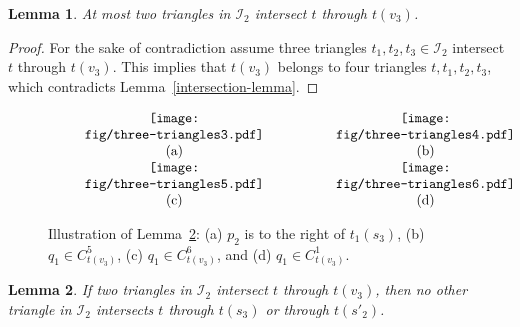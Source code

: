 \documentclass[11pt,a4paper]{article}
\newcommand{\trmin}{t}
\newcommand{\tra}[2]{{#1}({#2})}
\newtheorem{lemma}{Lemma}
\begin{document}
\begin{lemma}
\label{vertex-intersection}
 At most two triangles in $\mathcal{I}_2$ intersect $\trmin$ through $\tra{\trmin}{v_3}$.
\end{lemma}
\begin{proof}
For the sake of contradiction assume three triangles $t_1,t_2, t_3\in \mathcal{I}_2$ intersect $\trmin$ through $\tra{\trmin}{v_3}$. This implies that $\tra{\trmin}{v_3}$ belongs to four triangles $t,t_1,t_2,t_3$, which contradicts Lemma~\ref{intersection-lemma}. \end{proof}

\begin{figure}[htb]
  \centering
\setlength{\tabcolsep}{0in}
  $\begin{tabular}{cc}
\multicolumn{1}{m{.5\columnwidth}}{\centering\texttt{[image: fig/three-triangles3.pdf]}}
&\multicolumn{1}{m{.5\columnwidth}}{\centering\texttt{[image: fig/three-triangles4.pdf]}} \\
(a) & (b)\\\multicolumn{1}{m{.5\columnwidth}}{\centering\texttt{[image: fig/three-triangles5.pdf]}}
&\multicolumn{1}{m{.5\columnwidth}}{\centering\texttt{[image: fig/three-triangles6.pdf]}} \\
(c) & (d)
\end{tabular}$
  \caption{Illustration of Lemma~\ref{vertex-side-intersection-2}: (a) $p_2$ is to the right of $t_1(s_3)$, (b) $q_1\in C^5_{\tra{t}{v_3}}$, (c) $q_1\in C^6_{\tra{t}{v_3}}$, and (d) $q_1\in C^1_{\tra{t}{v_3}}$.}
\label{three-triangle-fig2}
\end{figure}
\begin{lemma}
\label{vertex-side-intersection-2}
If two triangles in $\mathcal{I}_2$ intersect $\trmin$ through $\tra{\trmin}{v_3}$, then no other triangle in $\mathcal{I}_2$ intersects $\trmin$ through $\tra{\trmin}{s_3}$ or through $\tra{\trmin}{s'_2}$. 
\end{lemma}
\end{document}
